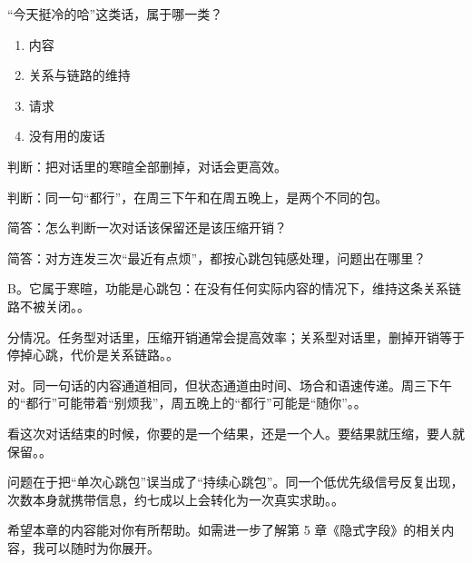 \begin{quizsec}
\item “今天挺冷的哈”这类话，属于哪一类？

\begin{enumerate}[label=\Alph*., leftmargin=2.2em, labelsep=0.6em,
                  itemsep=0.2em, topsep=0.3em, parsep=0.1em]
\item 内容
\item 关系与链路的维持
\item 请求
\item 没有用的废话
\end{enumerate}

\item 判断：把对话里的寒暄全部删掉，对话会更高效。

\item 判断：同一句“都行”，在周三下午和在周五晚上，是两个不同的包。

\item 简答：怎么判断一次对话该保留还是该压缩开销？

\item 简答：对方连发三次“最近有点烦”，都按心跳包钝感处理，问题出在哪里？
\end{quizsec}

\begin{answerssec}
\item B。它属于寒暄，功能是心跳包：在没有任何实际内容的情况下，维持这条关系链路不被关闭。。

\item 分情况。任务型对话里，压缩开销通常会提高效率；关系型对话里，删掉开销等于停掉心跳，代价是关系链路。。

\item 对。同一句话的内容通道相同，但状态通道由时间、场合和语速传递。周三下午的“都行”可能带着“别烦我”，周五晚上的“都行”可能是“随你”。。

\item 看这次对话结束的时候，你要的是一个结果，还是一个人。要结果就压缩，要人就保留。。

\item 问题在于把“单次心跳包”误当成了“持续心跳包”。同一个低优先级信号反复出现，次数本身就携带信息，约七成以上会转化为一次真实求助。。
\end{answerssec}

\hcirule

\begin{qabox}
\end{qabox}

\hcirule

希望本章的内容能对你有所帮助。如需进一步了解第 5 章《隐式字段》的相关内容，我可以随时为你展开。

